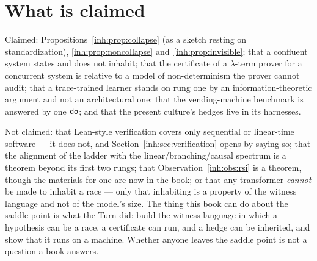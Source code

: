 \section{What is claimed}
\label{inh:sec:claims}

Claimed: Propositions~\ref{inh:prop:collapse} (as a sketch resting on
standardization), \ref{inh:prop:noncollapse} and~\ref{inh:prop:invisible};
that a confluent system states and does not inhabit; that the
certificate of a $\lambda$-term prover for a concurrent system is
relative to a model of non-determinism the prover cannot audit; that a
trace-trained learner stands on rung one by an information-theoretic
argument and not an architectural one; that the vending-machine
benchmark is answered by one $\textsf{do}$; and that the present culture's
hedges live in its harnesses.

Not claimed: that Lean-style verification covers only sequential or
linear-time software --- it does not, and Section~\ref{inh:sec:verification}
opens by saying so; that the alignment of the ladder with the
linear/branching/causal spectrum is a theorem beyond its first two
rungs; that Observation~\ref{inh:obs:rsi} is a theorem, though the
materials for one are now in the book; or that any transformer
\emph{cannot} be made to inhabit a race --- only that inhabiting is a
property of the witness language and not of the model's size.
The thing this book can do about the saddle point is what the Turn
did: build the witness language in which a hypothesis can be a race, a
certificate can run, and a hedge can be inherited, and show that it
runs on a machine.
Whether anyone leaves the saddle point is not a question a book
answers.

